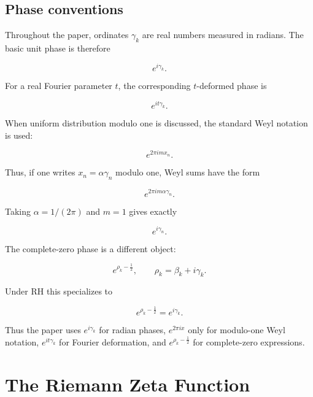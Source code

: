 \documentclass[11pt]{amsart}
\numberwithin{equation}{section}
\theoremstyle{plain}
\theoremstyle{definition}
\theoremstyle{remark}
\begin{document}
\subsection*{Phase conventions}

Throughout the paper, ordinates \(\gamma_k\) are real numbers measured
in radians. The basic unit phase is therefore

\begin{equation}
e^{i\gamma_k}.
\end{equation}

For a real Fourier parameter \(t\), the corresponding \(t\)-deformed
phase is

\begin{equation}
e^{it\gamma_k}.
\end{equation}

When uniform distribution modulo one is discussed, the standard Weyl
notation is used:

\begin{equation}
e^{2\pi i m x_n}.
\end{equation}

Thus, if one writes \(x_n=\alpha\gamma_n\) modulo one, Weyl sums have
the form

\begin{equation}
e^{2\pi i m\alpha\gamma_n}.
\end{equation}

Taking \(\alpha=1/(2\pi)\) and \(m=1\) gives exactly

\begin{equation}
e^{i\gamma_n}.
\end{equation}

The complete-zero phase is a different object:

\begin{equation}
e^{\rho_k-\frac12},
\qquad
\rho_k=\beta_k+i\gamma_k.
\end{equation}

Under RH this specializes to

\begin{equation}
e^{\rho_k-\frac12}=e^{i\gamma_k}.
\end{equation}

Thus the paper uses \(e^{i\gamma_k}\) for radian phases,
\(e^{2\pi i x}\) only for modulo-one Weyl notation,
\(e^{it\gamma_k}\) for Fourier deformation, and
\(e^{\rho_k-\frac12}\) for complete-zero expressions.

\section{The Riemann Zeta Function}
\label{sec:zeta_function}
\end{document}
